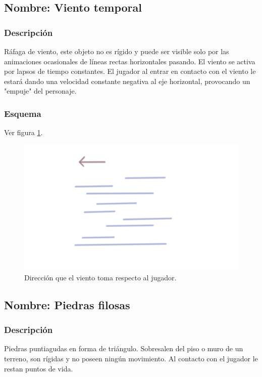 \documentclass[11pt,letterpaper]{article}
\begin{document}
		\subsection{Nombre: Viento temporal}\label{obs.vientoT}
	\subsubsection{Descripción}
	Ráfaga de viento, este objeto no es rígido y puede ser visible solo por las animaciones ocasionales de líneas rectas horizontales pasando. El viento se activa por lapsos de tiempo constantes. El jugador al entrar en contacto con el viento le estará dando una velocidad constante negativa al eje horizontal, provocando un "empuje" del personaje. 
	\subsubsection{Esquema}
	Ver figura \ref{fig:vientoT}.
	\begin{figure}
		\centering
		\includegraphics[height=0.2 \textheight]{Imagenes/vientoT}
		\caption{Dirección que el viento toma respecto al jugador.}
		\label{fig:vientoT}
	\end{figure}
		\subsection{Nombre: Piedras filosas}\label{obs.piedrasF}
	\subsubsection{Descripción}
	Piedras puntiagudas en forma de triángulo. Sobresalen del piso o muro de un terreno, son rígidas y no poseen ningún movimiento. Al contacto con el jugador le restan puntos de vida.
\end{document}
